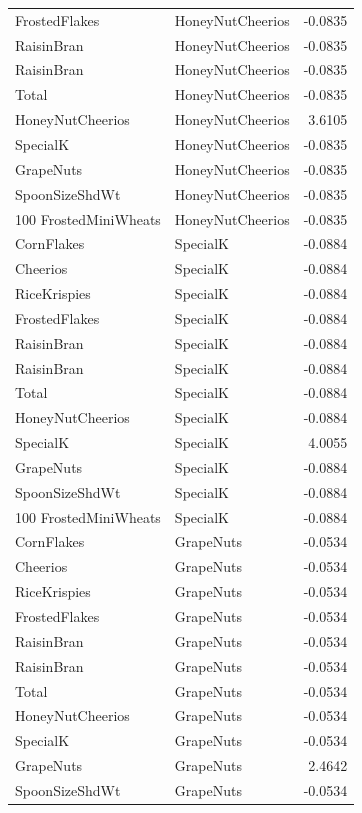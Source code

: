 \begin{longtable}{llr}
FrostedFlakes & HoneyNutCheerios & -0.0835 \\
RaisinBran & HoneyNutCheerios & -0.0835 \\
RaisinBran & HoneyNutCheerios & -0.0835 \\
Total & HoneyNutCheerios & -0.0835 \\
HoneyNutCheerios & HoneyNutCheerios & 3.6105 \\
SpecialK & HoneyNutCheerios & -0.0835 \\
GrapeNuts & HoneyNutCheerios & -0.0835 \\
SpoonSizeShdWt & HoneyNutCheerios & -0.0835 \\
100%
FrostedMiniWheats & HoneyNutCheerios & -0.0835 \\
CornFlakes & SpecialK & -0.0884 \\
Cheerios & SpecialK & -0.0884 \\
RiceKrispies & SpecialK & -0.0884 \\
FrostedFlakes & SpecialK & -0.0884 \\
RaisinBran & SpecialK & -0.0884 \\
RaisinBran & SpecialK & -0.0884 \\
Total & SpecialK & -0.0884 \\
HoneyNutCheerios & SpecialK & -0.0884 \\
SpecialK & SpecialK & 4.0055 \\
GrapeNuts & SpecialK & -0.0884 \\
SpoonSizeShdWt & SpecialK & -0.0884 \\
100%
FrostedMiniWheats & SpecialK & -0.0884 \\
CornFlakes & GrapeNuts & -0.0534 \\
Cheerios & GrapeNuts & -0.0534 \\
RiceKrispies & GrapeNuts & -0.0534 \\
FrostedFlakes & GrapeNuts & -0.0534 \\
RaisinBran & GrapeNuts & -0.0534 \\
RaisinBran & GrapeNuts & -0.0534 \\
Total & GrapeNuts & -0.0534 \\
HoneyNutCheerios & GrapeNuts & -0.0534 \\
SpecialK & GrapeNuts & -0.0534 \\
GrapeNuts & GrapeNuts & 2.4642 \\
SpoonSizeShdWt & GrapeNuts & -0.0534 \\

\end{longtable}
